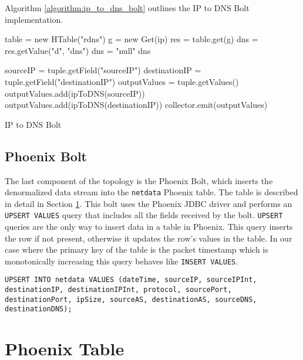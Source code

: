 Algorithm \ref{algorithm:ip_to_dns_bolt} outlines the IP to DNS Bolt implementation.

\begin{algorithm}[H]
\begin{algorithmic}[1]
\State table = new HTable("rdns")
\State g = new Get(ip)
\State res = table.get(g)
\State dns = res.getValue("d", "dns")
\State dns = "null"
\EndIf
\Return dns
\EndFunction

\State sourceIP = tuple.getField("sourceIP")
\State destinationIP = tuple.getField("destinationIP")
\State outputValues = tuple.getValues()
\State outputValues.add(ipToDNS(sourceIP))
\State outputValues.add(ipToDNS(destinationIP))
\State collector.emit(outputValues)
\EndFunction
\end{algorithmic}
\caption{IP to DNS Bolt}
\label{algorithm:ip_to_dns_bolt}
\end{algorithm}

\subsection{Phoenix Bolt}

The last component of the topology is the Phoenix Bolt, which inserts the denormalized data stream into the \texttt{netdata} Phoenix table. The table is described in detail in Section \ref{section:system_phoenix_table}. This bolt uses the Phoenix JDBC driver and performs an \texttt{UPSERT VALUES} query that includes all the fields received by the bolt. \texttt{UPSERT} queries are the only way to insert data in a table in Phoenix. This query inserts the row if not present, otherwise it updates the row's values in the table. In our case where the primary key of the table is the packet timestamp which is monotonically increasing this query behaves like \texttt{INSERT VALUES}.

\begin{lstlisting}[language=PhoenixSQL]
UPSERT INTO netdata VALUES (dateTime, sourceIP, sourceIPInt, destinationIP, destinationIPInt, protocol, sourcePort, destinationPort, ipSize, sourceAS, destinationAS, sourceDNS, destinationDNS);
\end{lstlisting}


\section{Phoenix Table}\label{section:system_phoenix_table}

